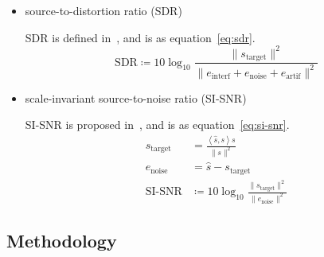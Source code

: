\begin{itemize}
    \item source-to-distortion ratio (SDR)

    SDR is defined in~\cite{performance_measurement}, and is as equation~\ref{eq:sdr}.
    \begin{equation}
        \text{SDR} \coloneqq 10\log_{10}\frac{\| s_{\text{target}} \|^2}{\| e_{\text{interf}} + e_{\text{noise}} + e_{\text{artif}} \|^2}
        \label{eq:sdr}
    \end{equation}

    \item scale-invariant source-to-noise ratio (SI-SNR)

    SI-SNR is proposed in~\cite{tasnet}, and is as equation~\ref{eq:si-snr}.
    \begin{equation}
        \begin{aligned}
            s_{\text{target}} &= \frac{\left< \hat{s}, s \right>s}{\| s \|^2} \\
            e_{\text{noise}} &= \hat{s} - s_{\text{target}} \\
            \text{SI-SNR} &\coloneqq 10\log_{10}\frac{\| s_{\text{target}} \|^2}{\| e_{\text{noise}} \|^2}
        \end{aligned}\label{eq:si-snr}
    \end{equation}
\end{itemize}

\subsection{Methodology}\label{subsec:methodology}
